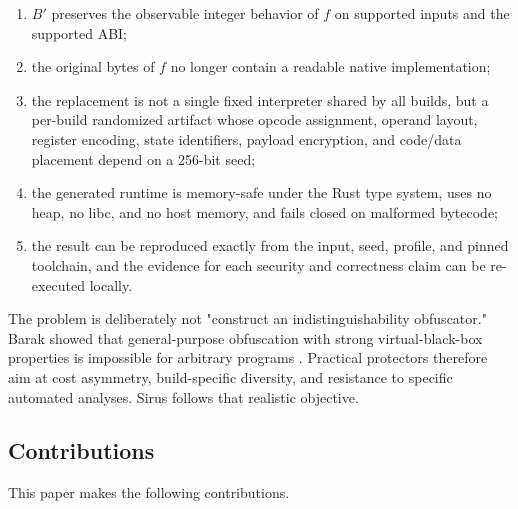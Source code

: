 \begin{enumerate}
  \item $B'$ preserves the observable integer behavior of $f$ on supported
        inputs and the supported ABI;
  \item the original bytes of $f$ no longer contain a readable native
        implementation;
  \item the replacement is not a single fixed interpreter shared by all builds,
        but a per-build randomized artifact whose opcode assignment, operand
        layout, register encoding, state identifiers, payload encryption, and
        code/data placement depend on a 256-bit seed;
  \item the generated runtime is memory-safe under the Rust type system, uses
        no heap, no libc, and no host memory, and fails closed on malformed
        bytecode;
  \item the result can be reproduced exactly from the input, seed, profile, and
        pinned toolchain, and the evidence for each security and correctness
        claim can be re-executed locally.
\end{enumerate}

The problem is deliberately not "construct an indistinguishability obfuscator."
Barak \etal{} showed that general-purpose obfuscation with strong
virtual-black-box properties is impossible for arbitrary programs
\cite{barak2012}. Practical protectors therefore aim at cost asymmetry,
build-specific diversity, and resistance to specific automated analyses. Sirus
follows that realistic objective.

\subsection{Contributions}

This paper makes the following contributions.

